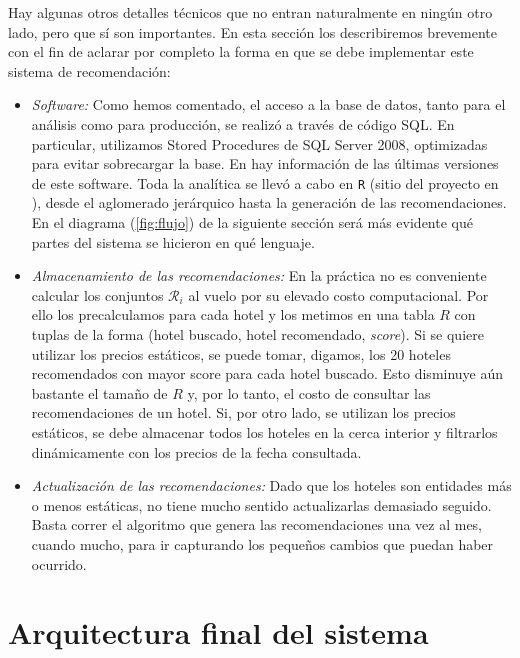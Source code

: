 \documentclass[12pt]{report}
\newcommand{\RR}{\mathcal{R}}
\begin{document}
Hay algunas otros detalles técnicos que no entran naturalmente en ningún otro lado, pero que sí son importantes. En esta sección los describiremos brevemente con el fin de aclarar por completo la forma en que se debe implementar este sistema de recomendación:
\begin{itemize}
	\item \emph{Software:} Como hemos comentado, el acceso a la base de datos, tanto para el análisis como para producción, se realizó a través de código SQL. En particular, utilizamos Stored Procedures de SQL Server 2008, optimizadas para evitar sobrecargar la base. En \cite{sql} hay información de las últimas versiones de este software. Toda la analítica se llevó a cabo en \texttt{R} (sitio del proyecto en \cite{R}), desde el aglomerado jerárquico hasta la generación de las recomendaciones. En el diagrama (\ref{fig:flujo}) de la siguiente sección será más evidente qué partes del sistema se hicieron en qué lenguaje.
	\item \emph{Almacenamiento de las recomendaciones:} En la práctica no es conveniente calcular los conjuntos $\RR_i$ al vuelo por su elevado costo computacional. Por ello los precalculamos para cada hotel y los metimos en una tabla $R$ con tuplas de la forma (hotel buscado, hotel recomendado, \emph{score}). Si se quiere utilizar los precios estáticos, se puede tomar, digamos, los 20 hoteles recomendados con mayor score para cada hotel buscado. Esto disminuye aún bastante el tamaño de $R$ y, por lo tanto, el costo de consultar las recomendaciones de un hotel. Si, por otro lado, se utilizan los precios estáticos, se debe almacenar todos los hoteles en la cerca interior y filtrarlos dinámicamente con los precios de la fecha consultada.
	\item \emph{Actualización de las recomendaciones:} Dado que los hoteles son entidades más o menos estáticas, no tiene mucho sentido actualizarlas demasiado seguido. Basta correr el algoritmo que genera las recomendaciones una vez al mes, cuando mucho, para ir capturando los pequeños cambios que puedan haber ocurrido.
\end{itemize}


\section{Arquitectura final del sistema}
\end{document}
